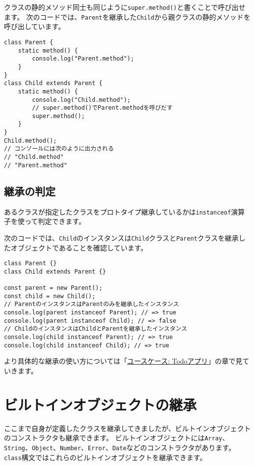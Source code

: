 クラスの静的メソッド同士も同じように\texttt{super.method()}と書くことで呼び出せます。
次のコードでは、\texttt{Parent}を継承した\texttt{Child}から親クラスの静的メソッドを呼び出しています。

\begin{lstlisting}
class Parent {
    static method() {
        console.log("Parent.method");
    }
}
class Child extends Parent {
    static method() {
        console.log("Child.method");
        // super.method()でParent.methodを呼びだす
        super.method();
    }
}
Child.method(); 
// コンソールには次のように出力される
// "Child.method"
// "Parent.method"
\end{lstlisting}

\hypertarget{instanceof}{%
\subsection{継承の判定}\label{instanceof}}

あるクラスが指定したクラスをプロトタイプ継承しているかは\texttt{instanceof}演算子を使って判定できます。

次のコードでは、\texttt{Child}のインスタンスは\texttt{Child}クラスと\texttt{Parent}クラスを継承したオブジェクトであることを確認しています。

\begin{lstlisting}
class Parent {}
class Child extends Parent {}

const parent = new Parent();
const child = new Child();
// ParentのインスタンスはParentのみを継承したインスタンス
console.log(parent instanceof Parent); // => true
console.log(parent instanceof Child); // => false
// ChildのインスタンスはChildとParentを継承したインスタンス
console.log(child instanceof Parent); // => true
console.log(child instanceof Child); // => true
\end{lstlisting}

より具体的な継承の使い方については「\hyperlink{todo-app}{ユースケース: Todoアプリ}」の章で見ていきます。

\hypertarget{extends-built-in}{%
\section{ビルトインオブジェクトの継承}\label{extends-built-in}}

ここまで自身が定義したクラスを継承してきましたが、ビルトインオブジェクトのコンストラクタも継承できます。
ビルトインオブジェクトには\texttt{Array}、\texttt{String}、\texttt{Object}、\texttt{Number}、\texttt{Error}、\texttt{Date}などのコンストラクタがあります。
\texttt{class}構文ではこれらのビルトインオブジェクトを継承できます。


